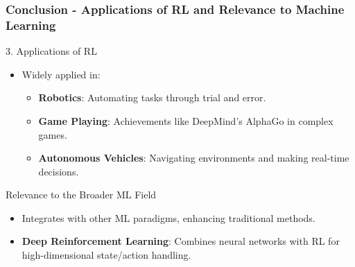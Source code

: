 \documentclass[aspectratio=169]{beamer}
\begin{document}
\begin{frame}[fragile]
    \frametitle{Conclusion - Applications of RL and Relevance to Machine Learning}
    
    \begin{block}{3. Applications of RL}
        \begin{itemize}
            \item Widely applied in:
            \begin{itemize}
                \item \textbf{Robotics}: Automating tasks through trial and error.
                \item \textbf{Game Playing}: Achievements like DeepMind's AlphaGo in complex games.
                \item \textbf{Autonomous Vehicles}: Navigating environments and making real-time decisions.
            \end{itemize}
        \end{itemize}
    \end{block}
    
    \begin{block}{Relevance to the Broader ML Field}
        \begin{itemize}
            \item Integrates with other ML paradigms, enhancing traditional methods.
            \item \textbf{Deep Reinforcement Learning}: Combines neural networks with RL for high-dimensional state/action handling.
        \end{itemize}
    \end{block}
    
\end{frame}
\end{document}

